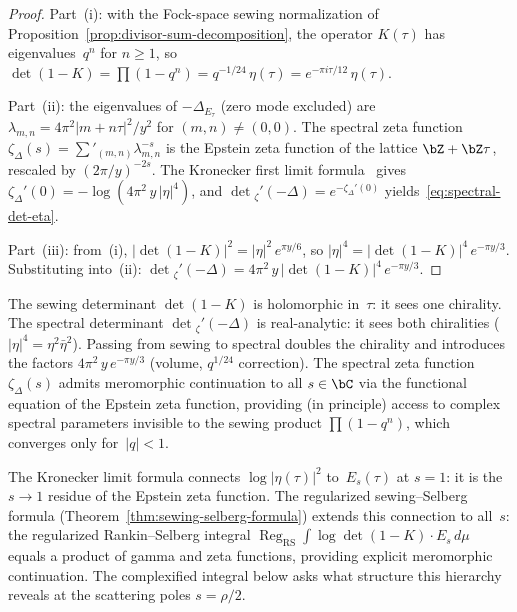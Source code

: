\begin{proof}
Part~(i): with the Fock-space sewing normalization of
Proposition~\ref{prop:divisor-sum-decomposition}, the operator
$K(\tau)$ has eigenvalues~$q^n$ for $n\ge 1$, so
$\det(1-K) = \prod(1-q^n) = q^{-1/24}\,\eta(\tau)
= e^{-\pi i\tau/12}\,\eta(\tau)$.

Part~(ii): the eigenvalues of $-\Delta_{E_\tau}$
(zero mode excluded) are
$\lambda_{m,n} = 4\pi^2\lvert m+n\tau\rvert^2/y^2$
for $(m,n)\ne(0,0)$. The spectral zeta function
$\zeta_\Delta(s) = \sum'_{(m,n)} \lambda_{m,n}^{-s}$
is the Epstein zeta function of the lattice
$\bZ+\bZ\tau$, rescaled by $(2\pi/y)^{-2s}$. The Kronecker
first limit formula~\cite{Selberg1956} gives
$\zeta_\Delta'(0)
= -\log(4\pi^2\,y\,\lvert\eta\rvert^4)$,
and $\det{}_\zeta'(-\Delta) = e^{-\zeta_\Delta'(0)}$
yields~\eqref{eq:spectral-det-eta}.

Part~(iii): from~(i),
$\lvert\det(1-K)\rvert^2
= \lvert\eta\rvert^2\,e^{\pi y/6}$,
so $\lvert\eta\rvert^4
= \lvert\det(1-K)\rvert^4\,e^{-\pi y/3}$.
Substituting into~(ii):
$\det{}_\zeta'(-\Delta)
= 4\pi^2\,y\,\lvert\det(1-K)\rvert^4\,e^{-\pi y/3}$.
\end{proof}

\begin{remark}%
\label{rem:two-chiralities}%
%
The sewing determinant $\det(1-K)$ is holomorphic in~$\tau$:
it sees one chirality. The spectral determinant
$\det{}_\zeta'(-\Delta)$ is real-analytic: it sees both
chiralities ($\lvert\eta\rvert^4 = \eta^2\bar\eta^2$).
Passing from sewing to spectral doubles the chirality
and introduces the factors $4\pi^2\,y\,e^{-\pi y/3}$
(volume, $q^{1/24}$ correction). The spectral zeta function
$\zeta_\Delta(s)$ admits meromorphic continuation to
all $s\in\bC$ via the functional equation of the Epstein zeta
function, providing (in principle) access to complex spectral
parameters invisible to the sewing product $\prod(1-q^n)$,
which converges only for~$\lvert q\rvert < 1$.
\end{remark}

\begin{remark}%
\label{rem:kronecker-limit}%
%
The Kronecker limit formula connects
$\log\lvert\eta(\tau)\rvert^2$ to~$E_s(\tau)$ at $s=1$:
it is the $s\to 1$ residue of the Epstein zeta function.
The regularized sewing--Selberg formula
(Theorem~\ref{thm:sewing-selberg-formula}) extends this
connection to all~$s$: the regularized Rankin--Selberg integral
$\operatorname*{Reg}_{\mathrm{RS}}\int\log\det(1-K)\cdot
E_s\,d\mu$ equals a product of gamma and zeta functions, providing
explicit meromorphic continuation. The complexified integral below
asks what structure this hierarchy reveals at the scattering poles
$s = \rho/2$.
\end{remark}

